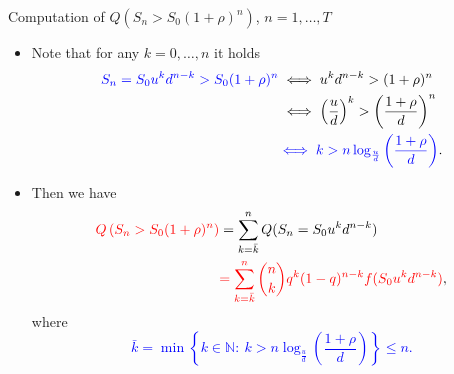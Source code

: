 \documentclass[9 pt]{beamer} %
\def \blue {\textcolor{blue}}
\def \red {\textcolor{red}}
\begin{document}
\begin{frame}{Computation of $Q(S_{n}>S_0(1+\rho)^{n})$, $n=1,\dots,T$}
\begin{itemize}
\item Note that for any $k =0, \dots,n$ it holds
\begin{align}
\blue{S_{n}=S_0u^kd^{n-k}>S_0(1+\rho)^{n}}& \iff u^kd^{n-k} > (1+\rho)^n \notag \\
& \iff \left(\frac{u}{d}\right)^k > \left(\frac{1+\rho}{d}\right)^n \notag \\
& \blue{\iff k > n \log_{ \frac{u}{d}} \left(\frac{1+\rho}{d}\right)}. \notag 
\end{align}
\item Then we have
\begin{align}
\red{Q\left(S_{n}>S_0(1+\rho)^{n}\right)}&=\sum_{k=\bar{k}}^n Q(S_{n}=S_0u^{k}d^{n-k}) \notag \\
&\red{=\sum_{k=\bar{k}}^n  \binom{n}{k}q^k(1-q)^{n-k}f(S_0u^{k}d^{n-k})},\notag
\end{align}
where 
\blue{$$
\bar{k}=\min\left\{k \in \mathbb{N}: \ k > n \log_{ \frac{u}{d}} \left(\frac{1+\rho}{d}\right)\right\}\le n.
$$}
\end{itemize}
\end{frame}
\end{document}
